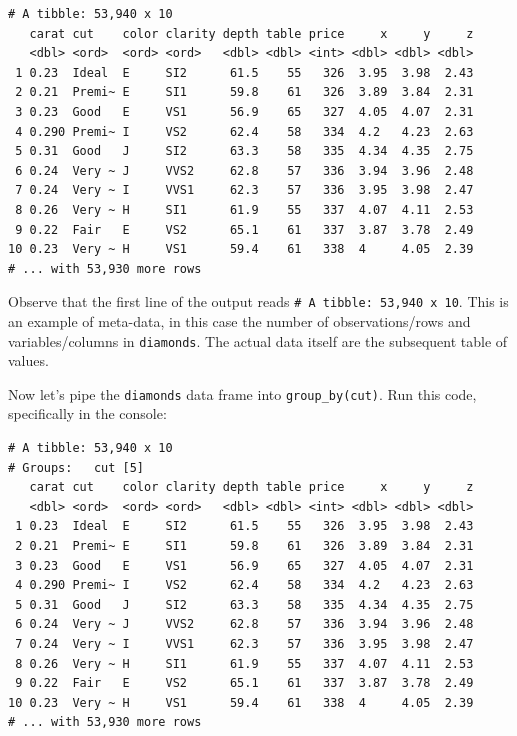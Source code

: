 \documentclass[12pt, krantz2,]{krantz}
\makeatletter
\newenvironment{Shaded}{\begin{snugshade}}{\end{snugshade}}
\newcommand{\KeywordTok}[1]{\textcolor[rgb]{0.27,0.27,0.27}{\textbf{#1}}}
\newcommand{\NormalTok}[1]{#1}
\newcommand{\OperatorTok}[1]{\textcolor[rgb]{0.43,0.43,0.43}{\textbf{#1}}}
\newcommand{\StringTok}[1]{\textcolor[rgb]{0.5,0.5,0.5}{#1}}
\newenvironment{kframe}{%
\medskip{}
\setlength{\fboxsep}{.8em}
 \def\at@end@of@kframe{}%
 \ifinner\ifhmode%
  \def\at@end@of@kframe{\end{minipage}}%
  \begin{minipage}{\columnwidth}%
 \fi\fi%
 \def\FrameCommand##1{\hskip\@totalleftmargin \hskip-\fboxsep
 \colorbox{shadecolor}{##1}\hskip-\fboxsep
     \hskip-\linewidth \hskip-\@totalleftmargin \hskip\columnwidth}%
 \MakeFramed {\advance\hsize-\width
   \@totalleftmargin\z@ \linewidth\hsize
   \@setminipage}}%
 {\par\unskip\endMakeFramed%
 \at@end@of@kframe}
\renewenvironment{Shaded}{\begin{kframe}}{\end{kframe}}
\makeatother
\begin{document}
\begin{verbatim}
# A tibble: 53,940 x 10
   carat cut    color clarity depth table price     x     y     z
   <dbl> <ord>  <ord> <ord>   <dbl> <dbl> <int> <dbl> <dbl> <dbl>
 1 0.23  Ideal  E     SI2      61.5    55   326  3.95  3.98  2.43
 2 0.21  Premi~ E     SI1      59.8    61   326  3.89  3.84  2.31
 3 0.23  Good   E     VS1      56.9    65   327  4.05  4.07  2.31
 4 0.290 Premi~ I     VS2      62.4    58   334  4.2   4.23  2.63
 5 0.31  Good   J     SI2      63.3    58   335  4.34  4.35  2.75
 6 0.24  Very ~ J     VVS2     62.8    57   336  3.94  3.96  2.48
 7 0.24  Very ~ I     VVS1     62.3    57   336  3.95  3.98  2.47
 8 0.26  Very ~ H     SI1      61.9    55   337  4.07  4.11  2.53
 9 0.22  Fair   E     VS2      65.1    61   337  3.87  3.78  2.49
10 0.23  Very ~ H     VS1      59.4    61   338  4     4.05  2.39
# ... with 53,930 more rows
\end{verbatim}

Observe that the first line of the output reads \texttt{\#\ A\ tibble:\ 53,940\ x\ 10}. This is an example of meta-data, in this case the number of observations/rows and variables/columns in \texttt{diamonds}. The actual data itself are the subsequent table of values.

Now let's pipe the \texttt{diamonds} data frame into \texttt{group\_by(cut)}. Run this code, specifically in the console:

\begin{Shaded}
\end{Shaded}

\begin{verbatim}
# A tibble: 53,940 x 10
# Groups:   cut [5]
   carat cut    color clarity depth table price     x     y     z
   <dbl> <ord>  <ord> <ord>   <dbl> <dbl> <int> <dbl> <dbl> <dbl>
 1 0.23  Ideal  E     SI2      61.5    55   326  3.95  3.98  2.43
 2 0.21  Premi~ E     SI1      59.8    61   326  3.89  3.84  2.31
 3 0.23  Good   E     VS1      56.9    65   327  4.05  4.07  2.31
 4 0.290 Premi~ I     VS2      62.4    58   334  4.2   4.23  2.63
 5 0.31  Good   J     SI2      63.3    58   335  4.34  4.35  2.75
 6 0.24  Very ~ J     VVS2     62.8    57   336  3.94  3.96  2.48
 7 0.24  Very ~ I     VVS1     62.3    57   336  3.95  3.98  2.47
 8 0.26  Very ~ H     SI1      61.9    55   337  4.07  4.11  2.53
 9 0.22  Fair   E     VS2      65.1    61   337  3.87  3.78  2.49
10 0.23  Very ~ H     VS1      59.4    61   338  4     4.05  2.39
# ... with 53,930 more rows
\end{verbatim}
\end{document}

